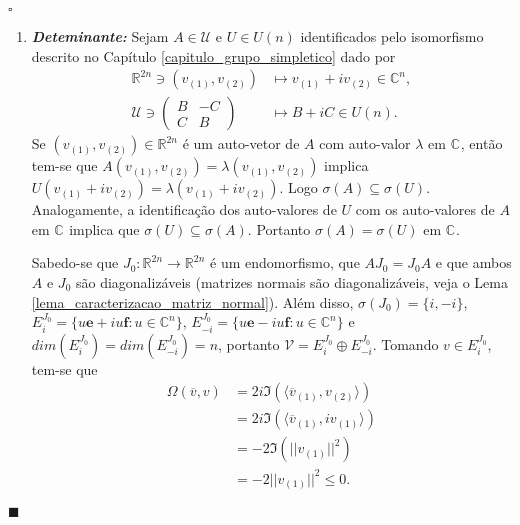 \documentclass[12pt]{book}
\newenvironment{prova}[1]{$\square$ #1}{\hfill$\blacksquare$}
\newcommand{\autoespaco}[1]{E_{#1}}
\newcommand{\complexificado}[1]{\mathcal{#1}}
\newcommand{\complexo}[1]{\mathbb{C}^{#1}}
\newcommand{\espectrooperador}[1]{\sigma(#1)}
\newcommand{\estruturacomplexa}{J_{0}}
\newcommand{\formaSimpleticaExtendida}[2]{\Omega(#1, #2)}
\newcommand{\matrizunitaria}[1]{U(#1)}
\newcommand{\norma}[1]{||#1||}
\newcommand{\parteImaginaria}[1]{\Im(#1)}
\newcommand{\produtointerno}[2]{\langle #1, #2 \rangle}
\newcommand{\real}[1]{\mathbb{R}^{#1}}
\begin{document}
\begin{prova}
\begin{enumerate}
			\item \textbf{\textit{Deteminante:}} Sejam $A \in \mathcal{U}$ e $U \in \matrizunitaria{n}$ identificados pelo isomorfismo descrito no Capítulo \ref{capitulo_grupo_simpletico} dado por
			$$
			\begin{aligned}
				\real{2n} \ni (v_{(1)},v_{(2)}) &\mapsto v_{(1)}+iv_{(2)} \in \complexo{n},
				\\
				\mathcal{U} \ni 
				\left(
					\begin{array}{cc}
					B & -C
					\\
					C & B
					\end{array}
				\right) 
				& \mapsto B+iC \in \matrizunitaria{n}.
			\end{aligned}
			$$
			Se $(v_{(1)},v_{(2)}) \in \real{2n}$ é um auto-vetor de $A$ com auto-valor $\lambda$ em $\complexo{}$, então tem-se que $A(v_{(1)},v_{(2)})=\lambda (v_{(1)},v_{(2)}) $ implica $U(v_{(1)}+iv_{(2)}) = \lambda(v_{(1)}+iv_{(2)})$. Logo $\espectrooperador{A} \subseteq \espectrooperador{U}$. Analogamente, a identificação dos auto-valores de $U$ com os auto-valores de $A$ em $\complexo{}$ implica que $\espectrooperador{U} \subseteq\espectrooperador{A}$. Portanto $\espectrooperador{A} =\espectrooperador{U}$ em $\complexo{}$.
			
			Sabedo-se que $\estruturacomplexa: \real{2n} \to \real{2n}$ é um endomorfismo, que $A\estruturacomplexa = \estruturacomplexa A$ e que ambos $A$ e $\estruturacomplexa$ são diagonalizáveis (matrizes normais são diagonalizáveis, veja o Lema \ref{lema_caracterizacao_matriz_normal}). Além disso, $\espectrooperador{\estruturacomplexa} = \{i,-i\}$, $\autoespaco{i}^{\estruturacomplexa} = \{u\textbf{e} +iu\textbf{f}: u \in \complexo{n}\}$, $\autoespaco{ -i}^{\estruturacomplexa} = \{u\textbf{e} -iu\textbf{f}: u \in \complexo{n}\}$ e $dim(\autoespaco{i}^{\estruturacomplexa} )=dim(\autoespaco{-i}^{\estruturacomplexa} )=n$, portanto $\complexificado{V} = \autoespaco{i}^{\estruturacomplexa}\oplus \autoespaco{-i}^{\estruturacomplexa}$. 
			Tomando $v \in \autoespaco{i}^{\estruturacomplexa}$, tem-se que 
			$$
			\begin{aligned}
				\formaSimpleticaExtendida{\overline{v}}{v} 
				&= 2i\parteImaginaria{\produtointerno{\overline{v}_{(1)}}{v_{(2)}}}
				\\
				&= 2i\parteImaginaria{\produtointerno{\overline{v}_{(1)}}{iv_{(1)}}}
				\\
				&=-2\parteImaginaria{\norma{v_{(1)}}^{2}}
				\\
				&=-2\norma{v_{(1)}}^{2} \leq 0.
			\end{aligned}
			$$
			

\end{enumerate}
\end{prova}
\end{document}

